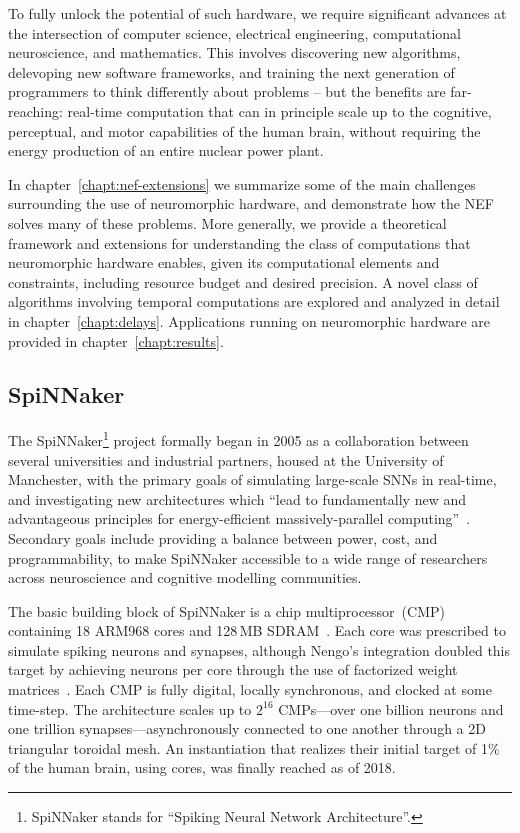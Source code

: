 To fully unlock the potential of such hardware, we require significant advances at the intersection of computer science, electrical engineering, computational neuroscience, and mathematics.
This involves discovering new algorithms, delevoping new software frameworks, and training the next generation of programmers to think differently about problems -- but the benefits are far-reaching: real-time computation that can in principle scale up to the cognitive, perceptual, and motor capabilities of the human brain, without requiring the energy production of an entire nuclear power plant.

In chapter~\ref{chapt:nef-extensions} we summarize some of the main challenges surrounding the use of neuromorphic hardware, and demonstrate how the NEF solves many of these problems.
More generally, we provide a theoretical framework and extensions for understanding the class of computations that neuromorphic hardware enables, given its computational elements and constraints, including resource budget and desired precision.
A novel class of algorithms involving temporal computations are explored and analyzed in detail in chapter~\ref{chapt:delays}.
Applications running on neuromorphic hardware are provided in chapter~\ref{chapt:results}.

\subsection{SpiNNaker}

The SpiNNaker\footnote{SpiNNaker stands for ``Spiking Neural Network Architecture''.} project formally began in 2005 as a collaboration between several universities and industrial partners, housed at the University of Manchester, with the primary goals of simulating large-scale SNNs in real-time, and investigating new architectures which ``lead to fundamentally new and advantageous principles for energy-efficient massively-parallel computing''~\citep{spinnakerproject, furber2014spinnaker}.
Secondary goals include providing a balance between power, cost, and programmability, to make SpiNNaker accessible to a wide range of researchers across neuroscience and cognitive modelling communities.

The basic building block of SpiNNaker is a chip multiprocessor~(CMP) containing 18 ARM968 cores and 128\,MB SDRAM~\citep{painkras2013spinnaker}.
Each core was prescribed to simulate  spiking neurons and  synapses, although Nengo's integration doubled this target by achieving  neurons per core through the use of factorized weight matrices~\citep{mundy2015}.
Each CMP is fully digital, locally synchronous, and clocked at some time-step.
The architecture scales up to $2^{16}$ CMPs---over one billion neurons and one trillion synapses---asynchronously connected to one another through a 2D triangular toroidal mesh.
An instantiation that realizes their initial target of 1\% of the human brain, using  cores, was finally reached as of 2018.

